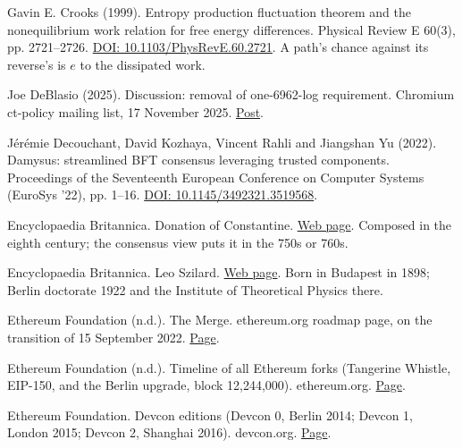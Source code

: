 \documentclass[11pt,twoside]{article}
\theoremstyle{thielethm}
\theoremstyle{thieledef}
\theoremstyle{thieledef}
\theoremstyle{thieledef}
\theoremstyle{thielethm}
\theoremstyle{thieleobs}
\theoremstyle{thielethm}
\begin{document}
\noindent Gavin E. Crooks (1999). Entropy production fluctuation theorem and the nonequilibrium work relation for free energy differences. Physical Review E 60(3), pp. 2721--2726. \href{https://doi.org/10.1103/PhysRevE.60.2721}{DOI: 10.1103/PhysRevE.60.2721}. A path's chance against its reverse's is $e$ to the dissipated work.
\par\medskip

\noindent Joe DeBlasio (2025). Discussion: removal of one-6962-log requirement. Chromium ct-policy mailing list, 17 November 2025. \href{https://groups.google.com/a/chromium.org/g/ct-policy/c/amrnTiDFdwM/m/mCyPDc4TAwAJ}{Post}.
\par\medskip

\noindent Jérémie Decouchant, David Kozhaya, Vincent Rahli and Jiangshan Yu (2022). Damysus: streamlined BFT consensus leveraging trusted components. Proceedings of the Seventeenth European Conference on Computer Systems (EuroSys '22), pp. 1--16. \href{https://doi.org/10.1145/3492321.3519568}{DOI: 10.1145/3492321.3519568}.
\par\medskip

\noindent Encyclopaedia Britannica. Donation of Constantine. \href{https://www.britannica.com/topic/Donation-of-Constantine}{Web page}. Composed in the eighth century; the consensus view puts it in the 750s or 760s.
\par\medskip

\noindent Encyclopaedia Britannica. Leo Szilard. \href{https://www.britannica.com/biography/Leo-Szilard}{Web page}. Born in Budapest in 1898; Berlin doctorate 1922 and the Institute of Theoretical Physics there.
\par\medskip

\noindent Ethereum Foundation (n.d.). The Merge. ethereum.org roadmap page, on the transition of 15 September 2022. \href{https://ethereum.org/roadmap/merge/}{Page}.
\par\medskip

\noindent Ethereum Foundation (n.d.). Timeline of all Ethereum forks (Tangerine Whistle, EIP-150, and the Berlin upgrade, block 12,244,000). ethereum.org. \href{https://ethereum.org/ethereum-forks/}{Page}.
\par\medskip

\noindent Ethereum Foundation. Devcon editions (Devcon 0, Berlin 2014; Devcon 1, London 2015; Devcon 2, Shanghai 2016). devcon.org. \href{https://devcon.org/past-events}{Page}.
\par\medskip
\end{document}
